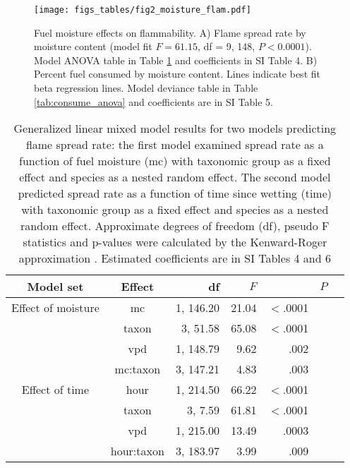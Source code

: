 \documentclass[letterpaper,12pt]{article}
\begin{document}
\begin{figure}[h]
  \centering
\texttt{[image: figs\_tables/fig2\_moisture\_flam.pdf]}
\caption{Fuel moisture effects on flammability. A) Flame spread rate by moisture content (model fit $F = 61.15$, df = 9,
  148, $P < 0.0001$). Model ANOVA table in Table \ref{tab:spreadrate_anova} and
  coefficients in SI Table 4. B) Percent fuel consumed by moisture content. Lines indicate best fit
  beta regression lines. Model deviance table in Table \ref{tab:consume_anova}
  and coefficients are in SI Table 5.}
  \label{fig:flam_moist}
\end{figure}

\begin{table}[h]
  \caption{Generalized linear mixed model results for two models predicting
    flame spread rate: the first model examined spread rate as a function of
    fuel moisture (mc) with taxonomic group as a fixed effect and species as a
    nested random effect. The second model predicted spread rate as a function
    of time since wetting (time) with taxonomic group as a fixed effect and
    species as a nested random effect. Approximate degrees of freedom (df),
    pseudo F statistics and p-values were calculated by the Kenward-Roger
    approximation \citep{Kenward_Roger-1997}. Estimated coefficients are in SI
    Tables 4 and 6}
  \label{tab:spreadrate_anova}
  
\centering
\begin{tabular}{ccrrrrr}
  \toprule
Model set & Effect & df & $F$ & & $P$ \\
  \midrule
  Effect of moisture & mc & 1, 146.20 & 21.04 & $<$.0001 \\ 
 & taxon & 3, 51.58 & 65.08 & $<$.0001 \\ 
 & vpd & 1, 148.79 & 9.62 & .002 \\ 
 & mc:taxon & 3, 147.21 & 4.83 & .003 \\ 
   
  \midrule
  
  Effect of time & hour & 1, 214.50 & 66.22 & $<$.0001 \\ 
 &  taxon & 3, 7.59 & 61.81 & $<$.0001 \\ 
 & vpd & 1, 215.00 & 13.49 & .0003 \\ 
 & hour:taxon & 3, 183.97 & 3.99 & .009 \\ 

   \bottomrule

\end{tabular}
\end{table}
\end{document}

